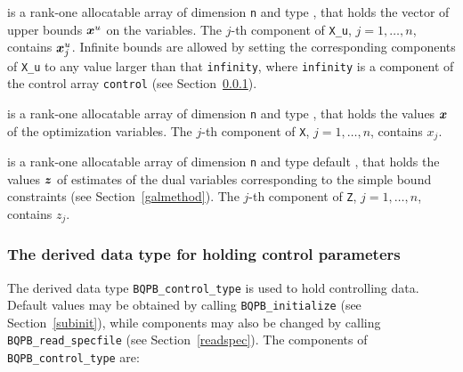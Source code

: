 \documentclass{galahad}
\newcommand{\packagename}{BQPB}
\begin{document}
\begin{description}
 is a rank-one allocatable array of dimension {\tt n} and type
\realdp, that holds
the vector of upper bounds ${\bm{x}}^{u}$ on the variables.
The $j$-th component of {\tt X\_u}, $j = 1, \ldots , n$,
contains ${\bm{x}}_{j}^{u}$.
Infinite bounds are allowed by setting the corresponding
components of {\tt X\_u} to any value larger than that {\tt infinity},
where {\tt infinity} is a component of the control array {\tt control}
(see Section~\ref{typecontrol}).

 is a rank-one allocatable array of dimension {\tt n} and type
\realdp,
that holds the values ${\bm{x}}$ of the optimization variables.
The $j$-th component of {\tt X}, $j = 1,  \ldots , n$, contains $x_{j}$.

 is a rank-one allocatable array of dimension {\tt n} and type default
\realdp, that holds
the values ${\bm{z}}$ of estimates  of the dual variables
corresponding to the simple bound constraints (see Section~\ref{galmethod}).
The $j$-th component of {\tt Z}, $j = 1,  \ldots ,  n$, contains $z_{j}$.

\end{description}


\subsubsection{The derived data type for holding control
 parameters}\label{typecontrol}
The derived data type
{\tt \packagename\_control\_type}
is used to hold controlling data. Default values may be obtained by calling
{\tt \packagename\_initialize}
(see Section~\ref{subinit}),
while components may also be changed by calling
{\tt \packagename\_read\-\_specfile}
(see Section~\ref{readspec}).
The components of
{\tt \packagename\_control\_type}
are:



\end{document}
